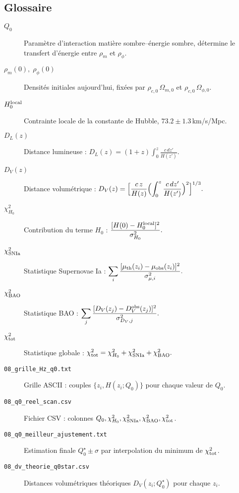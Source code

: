 \subsection*{Glossaire}

\begin{description}
  \item[$Q_{0}$] Paramètre d’interaction matière sombre–énergie sombre, détermine le transfert d’énergie entre \(\rho_{m}\) et \(\rho_{\phi}\).
  \item[$\rho_{m}(0),\;\rho_{\phi}(0)$] Densités initiales aujourd’hui, fixées par \(\rho_{c,0}\,\Omega_{m,0}\) et \(\rho_{c,0}\,\Omega_{\phi,0}\).
  \item[$H_{0}^{\rm local}$] Contrainte locale de la constante de Hubble, \(73.2\pm1.3\)\,km/s/Mpc.
  \item[$D_{L}(z)$] Distance lumineuse :
    \(\displaystyle D_{L}(z) = (1+z)\int_{0}^{z}\frac{c\,dz'}{H(z')}\).
  \item[$D_{V}(z)$] Distance volumétrique :
    \(\displaystyle D_{V}(z) = \Bigl[\frac{c\,z}{H(z)}\Bigl(\int_{0}^{z}\frac{c\,dz'}{H(z')}\Bigr)^{2}\Bigr]^{1/3}.\)
  \item[$\chi^{2}_{H_{0}}$] Contribution du terme \(H_{0}\) :
    \(\displaystyle \frac{[H(0)-H_{0}^{\rm local}]^{2}}{\sigma_{H_{0}}^{2}}.\)
  \item[$\chi^{2}_{\rm SNIa}$] Statistique Supernovae Ia :
    \(\displaystyle \sum_{i}\frac{[\mu_{\rm th}(z_{i})-\mu_{\rm obs}(z_{i})]^{2}}{\sigma_{\mu,i}^{2}}.\)
  \item[$\chi^{2}_{\rm BAO}$] Statistique BAO :
    \(\displaystyle \sum_{j}\frac{[D_{V}(z_{j})-D_{V}^{\rm obs}(z_{j})]^{2}}{\sigma_{D_{V},j}^{2}}.\)
  \item[$\chi^{2}_{\rm tot}$] Statistique globale :
    \(\chi^{2}_{\rm tot} = \chi^{2}_{H_{0}} + \chi^{2}_{\rm SNIa} + \chi^{2}_{\rm BAO}.\)
  \item[\texttt{08\_grille\_Hz\_q0.txt}] Grille ASCII : couples \(\{z_{i},H(z_{i};Q_{0})\}\) pour chaque valeur de \(Q_{0}\).
  \item[\texttt{08\_q0\_reel\_scan.csv}] Fichier CSV : colonnes \(Q_{0},\chi^{2}_{H_{0}},\chi^{2}_{\rm SNIa},\chi^{2}_{\rm BAO},\chi^{2}_{\rm tot}\).
  \item[\texttt{08\_q0\_meilleur\_ajustement.txt}] Estimation finale \(Q_{0}^{\star}\pm\sigma\) par interpolation du minimum de \(\chi^{2}_{\rm tot}\).
  \item[\texttt{08\_dv\_theorie\_q0star.csv}] Distances volumétriques théoriques \(D_{V}(z_{i};Q_{0}^{\star})\) pour chaque \(z_{i}\).

\end{description}
